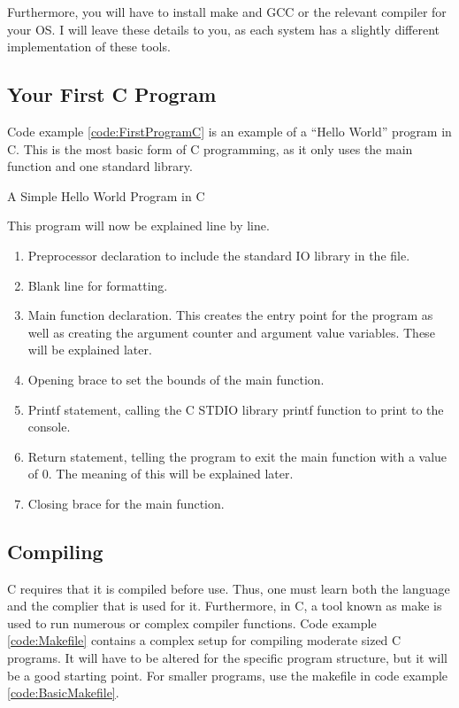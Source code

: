 			Furthermore, you will have to install make and GCC or the relevant compiler for your OS.
			I will leave these details to you, as each system has a slightly different implementation of these tools.

		\subsection{Your First C Program}
			Code example \ref{code:FirstProgramC} is an example of a ``Hello World'' program in C.
			This is the most basic form of C programming, as it only uses the main function and one standard library.
			\begin{code}
				\caption{A Simple Hello World Program in C}
				\label{code:FirstProgramC}
			\end{code}
			This program will now be explained line by line.
			\begin{enumerate}
				\item Preprocessor declaration to include the standard IO library in the file.
				\item Blank line for formatting.
				\item Main function declaration.
					This creates the entry point for the program as well as creating the argument counter and argument value variables.
					These will be explained later.
				\item Opening brace to set the bounds of the main function.
				\item Printf statement, calling the C STDIO library printf function to print to the console.
				\item Return statement, telling the program to exit the main function with a value of 0.
					The meaning of this will be explained later.
				\item Closing brace for the main function.
			\end{enumerate}
		\subsection{Compiling}
			C requires that it is compiled before use.
			Thus, one must learn both the language and the complier that is used for it.
			Furthermore, in C, a tool known as make is used to run numerous or complex compiler functions.
			Code example \ref{code:Makefile} contains a complex setup for compiling moderate sized C programs.
			It will have to be altered for the specific program structure, but it will be a good starting point.
			For smaller programs, use the makefile in code example \ref{code:BasicMakefile}.

